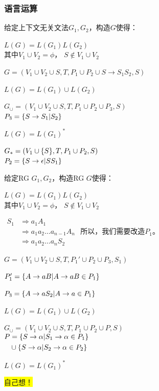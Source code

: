 \documentclass{ctexart}
\newcommand{\hl}[1]{\colorbox{yellow}{#1}}
\newcommand{\tto}{\Rightarrow}
\DeclarePairedDelimiter{\set}{\{}{\}}
\DeclarePairedDelimiter{\paren}{(}{)}
\begin{document}
\subsubsection{语言运算}
给定上下文无关文法$G_1,G_2$，构造$G$使得：
\begin{outline}[enumerate]
    \1 $L(G) = L(G_1)L(G_2)$ \\
        其中$V_1 \cup V_2 = \phi$， $S \notin V_1 \cup V_2$

        $G = (V_1 \cup V_2 \cup {S}, T, P_1 \cup P_2 \cup {S \to S_1S_2}, S)$

    \1 $L(G) = L(G_1) \cup L(G_2)$

        $G_\cup = (V_1 \cup V_2 \cup {S}, T, P_1 \cup P_2 \cup P_3, S)$ \\
        $P_3 = \set*{S \to S_1 | S_2}$

    \1 $L(G) = L(G_1)^*$

        $G_* = \paren*{V_1 \cup \set*{S}, T, P_1 \cup P_2, S}$ \\
        $P_2 = \set*{S \to \epsilon | SS_1}$

\end{outline}

给定RG $G_1,G_2$，构造RG $G$使得：
\begin{outline}[enumerate]
    \1 $L(G) = L(G_1)L(G_2)$ \\
        其中$V_1 \cup V_2 = \phi$， $S \notin V_1 \cup V_2$

        $\begin{aligned}
            S_1  & \tto a_1A_1 \\
                 & \tto a_1a_2\dots a_{n-1}A_n  \\
                 & \tto a_1a_2\dots a_nS_2
        \end{aligned}$
        所以，我们需要改造$P_1$。

        $G = (V_1 \cup V_2 \cup {S}, T, P_1' \cup P_2 \cup P_3, S_1)$

        $P_1' = \set*{A \to a B | A \to a B \in P_1}$
        
        $P_3 = \set*{A \to a S_2 | A \to a \in P_1}$

    \1 $L(G) = L(G_1) \cup L(G_2)$

        $G_\cup = (V_1 \cup V_2 \cup {S}, T, P_1 \cup P_2 \cup P, S)$ \\
        $\begin{aligned}
            P & = \set*{S \to \alpha | S_1 \to \alpha \in P_1} \\
            & \cup \set*{S \to \alpha | S_2 \to \alpha \in P_2} \\
        \end{aligned}$

    \1 $L(G) = L(G_1)^*$

        \hl{自己想！}
\end{outline}
\end{document}
